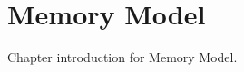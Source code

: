 \pagebreak
\chapter{Memory Model}
\label{chap:memory_model}

Chapter introduction for Memory Model.
